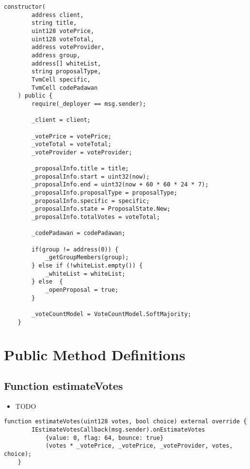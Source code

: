 \begin{lstlisting}[firstnumber=32]
    constructor(
        address client,
        string title,
        uint128 votePrice,
        uint128 voteTotal,
        address voteProvider,
        address group,
        address[] whiteList,
        string proposalType,
        TvmCell specific,
        TvmCell codePadawan
    ) public {
        require(_deployer == msg.sender);

        _client = client;

        _votePrice = votePrice;
        _voteTotal = voteTotal;
        _voteProvider = voteProvider;

        _proposalInfo.title = title;
        _proposalInfo.start = uint32(now);
        _proposalInfo.end = uint32(now + 60 * 60 * 24 * 7);
        _proposalInfo.proposalType = proposalType;
        _proposalInfo.specific = specific;
        _proposalInfo.state = ProposalState.New;
        _proposalInfo.totalVotes = voteTotal;

        _codePadawan = codePadawan;

        if(group != address(0)) {
            _getGroupMembers(group);
        } else if (!whiteList.empty()) {
            _whiteList = whiteList;
        } else  {
            _openProposal = true;
        }

        _voteCountModel = VoteCountModel.SoftMajority;
    }
\end{lstlisting}

\section{Public Method Definitions}


\subsection{Function estimateVotes}

\begin{itemize}
\item TODO
\end{itemize}

\begin{lstlisting}[firstnumber=78]
    function estimateVotes(uint128 votes, bool choice) external override {
        IEstimateVotesCallback(msg.sender).onEstimateVotes
            {value: 0, flag: 64, bounce: true}
            (votes * _votePrice, _votePrice, _voteProvider, votes, choice);
    }
\end{lstlisting}

